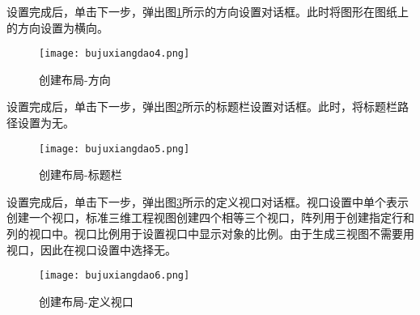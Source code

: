 \begin{procedure}
设置完成后，单击下一步，弹出图\ref{fig:bujuxiangdao4}所示的方向设置对话框。此时将图形在图纸上的方向设置为横向。
\newpage
\begin{figure}[htbp]
\centering
\texttt{[image: bujuxiangdao4.png]}
\caption{创建布局-方向}\label{fig:bujuxiangdao4}
\end{figure}

设置完成后，单击下一步，弹出图\ref{fig:bujuxiangdao5}所示的标题栏设置对话框。此时，将标题栏路径设置为无。
\begin{figure}[htbp]
\centering
\texttt{[image: bujuxiangdao5.png]}
\caption{创建布局-标题栏}\label{fig:bujuxiangdao5}
\end{figure}

设置完成后，单击下一步，弹出图\ref{fig:bujuxiangdao6}所示的定义视口对话框。视口设置中单个表示创建一个视口，标准三维工程视图创建四个相等三个视口，阵列用于创建指定行和列的视口中。视口比例用于设置视口中显示对象的比例。由于生成三视图不需要用视口，因此在视口设置中选择无。
\newpage
\begin{figure}[htbp]
\centering
\texttt{[image: bujuxiangdao6.png]}
\caption{创建布局-定义视口}\label{fig:bujuxiangdao6}
\end{figure}


\end{procedure}
